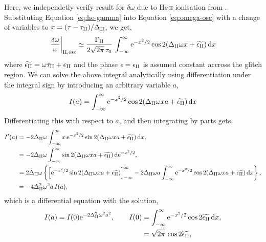 Here, we independetly verify result for \(\delta\omega\) due to He\,\textsc{ii} ionisation from \citet{Houdek.Gough2007}. Substituting Equation \ref{eq:he-gamma} into Equation \ref{eq:omega-osc} with a change of variables to \(x = (\tau - \tau_{{\mathrm{II}}})/\Delta_{{\mathrm{II}}}\), we get,
%
\begin{equation}
    \left.\frac{\delta\omega}{\omega}\right|_{{\mathrm{II}}, \mathrm{osc}} \simeq \frac{\Gamma_{{\mathrm{II}}}}{2\sqrt{2\pi} \, \tau_0} \, \int_{-\infty}^\infty \mathrm{e}^{- x^2/2} \cos 2 (\Delta_{{\mathrm{II}}} \omega x + \widetilde{\epsilon_{{\mathrm{II}}}}) \, \mathrm{d} x \label{eq:omega-ii-osc}
\end{equation}
%
where \(\widetilde{\epsilon_{{\mathrm{II}}}} = \omega\tau_{{\mathrm{II}}} + \epsilon_{{\mathrm{II}}}\) and the phase \(\epsilon=\epsilon_{{\mathrm{II}}}\) is assumed constant accross the glitch region. We can solve the above integral analytically using differentiation under the integral sign by introducing an arbitrary variable \(a\),
%
\begin{equation}
    I(a) = \int_{-\infty}^\infty \mathrm{e}^{- x^2/2 } \cos 2 (\Delta_{{\mathrm{II}}} \omega x a + \widetilde{\epsilon_{{\mathrm{II}}}}) \, \mathrm{d} x
\end{equation}
%
Differentiating this with respect to \(a\), and then integrating by parts gets,
%
\begin{align}
    I'(a) &= - 2 \Delta_{{\mathrm{II}}} \omega \int_{-\infty}^\infty x \, \mathrm{e}^{- x^2/2 } \sin 2 (\Delta_{{\mathrm{II}}} \omega x a + \widetilde{\epsilon_{{\mathrm{II}}}}) \, \mathrm{d} x, \notag\\
    &= - 2 \Delta_{{\mathrm{II}}} \omega \int_{-\infty}^\infty \sin 2 (\Delta_{{\mathrm{II}}} \omega x a + \widetilde{\epsilon_{{\mathrm{II}}}}) \, \mathrm{d} \mathrm{e}^{- x^2/2 }, \notag\\
    &= 2 \Delta_{{\mathrm{II}}} \omega \left\{ \left[ \mathrm{e}^{- x^2/2 } \sin 2 (\Delta_{{\mathrm{II}}} \omega x a + \widetilde{\epsilon_{{\mathrm{II}}}}) \right]_{-\infty}^\infty - 2 \Delta_{{\mathrm{II}}} \omega a \int_{-\infty}^\infty \mathrm{e}^{- x^2/2 } \cos 2 (\Delta_{{\mathrm{II}}} \omega x a + \widetilde{\epsilon_{{\mathrm{II}}}}) \, \mathrm{d} x \right\}, \notag\\
    &= - 4 \Delta_{{\mathrm{II}}}^2 \omega^2 a \, I(a),
\end{align}
%
which is a differential equation with the solution,
%
\begin{equation}
    \begin{split}
        I(a) = I(0) \mathrm{e}^{- 2 \Delta_{{\mathrm{II}}}^2 \omega^2 a^2}, \qquad I(0) &= \int_{-\infty}^\infty \mathrm{e}^{- x^2/2 } \cos 2 \widetilde{\epsilon_{{\mathrm{II}}}} \, \mathrm{d} x, \\
        &= \sqrt{2\pi} \, \cos 2 \widetilde{\epsilon_{{\mathrm{II}}}},
    \end{split}
\end{equation}
